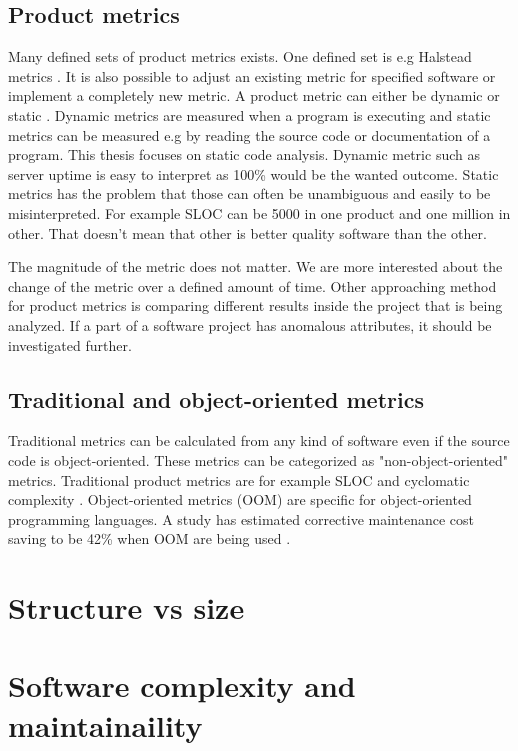 \subsection{Product metrics}

Many defined sets of product metrics exists. One defined set is e.g Halstead metrics \cite{al2005analysis}. It is also possible to adjust an existing metric for specified software or implement a completely new metric. A product metric can either be dynamic or static \cite{sommerville2011software}. Dynamic metrics are measured when a program is executing and static metrics can be measured e.g by reading the source code or documentation of a program. This thesis focuses on static code analysis. Dynamic metric such as server uptime is easy to interpret as 100\% would be the wanted outcome. Static metrics has the problem that those can often be unambiguous and easily to be misinterpreted. For example SLOC can be 5000 in one product and one million in other. That doesn't mean that other is better quality software than the other. 

The magnitude of the metric does not matter. We are more interested about the change of the metric over a defined amount of time. Other approaching method for product metrics is comparing different results inside the project that is being analyzed. If a part of a software project has anomalous attributes, it should be investigated further. 

\subsection{Traditional and object-oriented metrics}

Traditional metrics can be calculated from any kind of software even if the source code is object-oriented. These metrics can be categorized as "non-object-oriented" metrics.  Traditional product metrics are for example SLOC and cyclomatic complexity \cite{fenton1997software}. Object-oriented metrics (OOM) are specific for object-oriented programming languages. A study has estimated corrective maintenance cost saving to be 42\% when OOM are being used \cite{sarker2005overview}.

\section{Structure vs size}

\section{Software complexity and maintainaility}


